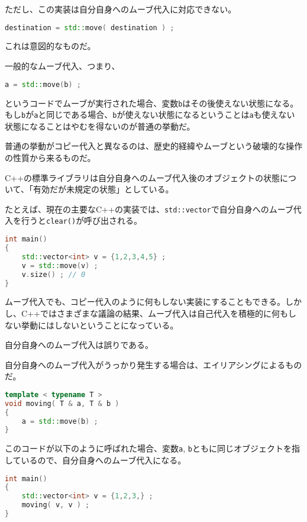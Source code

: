 ただし、この実装は自分自身へのムーブ代入に対応できない。

\begin{lstlisting}[language={C++}]
destination = std::move( destination ) ;
\end{lstlisting}

これは意図的なものだ。

一般的なムーブ代入、つまり、
\begin{lstlisting}[language={C++}]
a = std::move(b) ;
\end{lstlisting}
というコードでムーブが実行された場合、変数\texttt{b}はその後使えない状態になる。もし\texttt{b}が\texttt{a}と同じである場合、\texttt{b}が使えない状態になるということは\texttt{a}も使えない状態になることはやむを得ないのが普通の挙動だ。

普通の挙動がコピー代入と異なるのは、歴史的経緯やムーブという破壊的な操作の性質から来るものだ。

C++の標準ライブラリは自分自身へのムーブ代入後のオブジェクトの状態について、「有効だが未規定の状態」としている。

たとえば、現在の主要なC++の実装では、\texttt{std::vector}で自分自身へのムーブ代入を行うと\texttt{clear()}が呼び出される。

\begin{lstlisting}[language={C++}]
int main()
{
    std::vector<int> v = {1,2,3,4,5} ;
    v = std::move(v) ;
    v.size() ; // 0
}
\end{lstlisting}

ムーブ代入でも、コピー代入のように何もしない実装にすることもできる。しかし、C++ではさまざまな議論の結果、ムーブ代入は自己代入を積極的に何もしない挙動にはしないということになっている。

自分自身へのムーブ代入は誤りである。

自分自身へのムーブ代入がうっかり発生する場合は、エイリアシングによるものだ。

\begin{lstlisting}[language={C++}]
template < typename T >
void moving( T & a, T & b )
{
    a = std::move(b) ;
}
\end{lstlisting}

このコードが以下のように呼ばれた場合、変数\texttt{a}, \texttt{b}ともに同じオブジェクトを指しているので、自分自身へのムーブ代入になる。

\begin{lstlisting}[language={C++}]
int main()
{
    std::vector<int> v = {1,2,3,} ;
    moving( v, v ) ;
}
\end{lstlisting}

